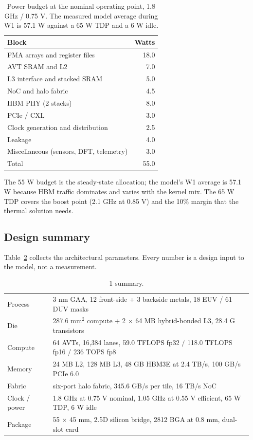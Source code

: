 \begin{table}[t]
\centering\small
\caption{Power budget at the nominal operating point, 1.8 GHz / 0.75 V. The measured model
average during W1 is 57.1 W against a 65 W TDP and a 6 W idle.}
\label{tab:power}
\begin{tabular}{@{}lr@{}}
\toprule
Block & Watts\\
\midrule
FMA arrays and register files & 18.0\\
AVT SRAM and L2 & 7.0\\
L3 interface and stacked SRAM & 5.0\\
NoC and halo fabric & 4.5\\
HBM PHY (2 stacks) & 8.0\\
PCIe / CXL & 3.0\\
Clock generation and distribution & 2.5\\
Leakage & 4.0\\
Miscellaneous (sensors, DFT, telemetry) & 3.0\\
\midrule
Total & 55.0\\
\bottomrule
\end{tabular}
\end{table}

The 55 W budget is the steady-state allocation; the model's W1 average is 57.1 W because HBM
traffic dominates and varies with the kernel mix. The 65 W TDP covers the boost point (2.1 GHz at
0.85 V) and the 10\% margin that the thermal solution needs.

\subsection{Design summary}
Table~\ref{tab:summary} collects the architectural parameters. Every number is a design input to
the model, not a measurement.

\begin{table}[t]
\centering\small
\caption{\ac{1} summary.}
\label{tab:summary}
\begin{tabularx}{\linewidth}{@{}lX@{}}
\toprule
Process & 3 nm GAA, 12 front-side + 3 backside metals, 18 EUV / 61 DUV masks\\
Die & 287.6 mm$^2$ compute + 2 $\times$ 64 MB hybrid-bonded L3, 28.4 G transistors\\
Compute & 64 AVTs, 16,384 lanes, 59.0 TFLOPS fp32 / 118.0 TFLOPS fp16 / 236 TOPS fp8\\
Memory & 24 MB L2, 128 MB L3, 48 GB HBM3E at 2.4 TB/s, 100 GB/s PCIe 6.0\\
Fabric & six-port halo fabric, 345.6 GB/s per tile, 16 TB/s NoC\\
Clock / power & 1.8 GHz at 0.75 V nominal, 1.05 GHz at 0.55 V efficient, 65 W TDP, 6 W idle\\
Package & 55 $\times$ 45 mm, 2.5D silicon bridge, 2812 BGA at 0.8 mm, dual-slot card\\
\bottomrule
\end{tabularx}
\end{table}

